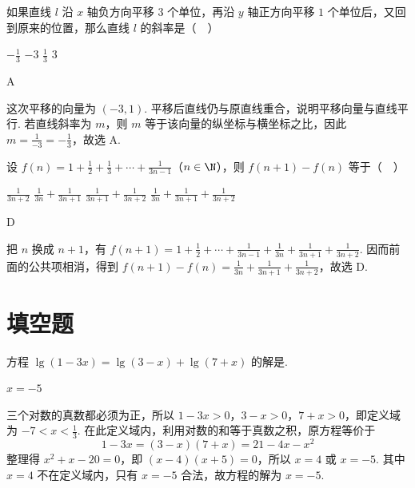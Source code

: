 \begin{problem}
如果直线 \(l\) 沿 \(x\) 轴负方向平移 \(3\) 个单位，再沿 \(y\) 轴正方向平移 \(1\) 个单位后，又回到原来的位置，那么直线 \(l\) 的斜率是（\(\quad\)）

\choices
    {\(-\frac{1}{3}\)}
    {\(-3\)}
    {\(\frac{1}{3}\)}
    {\(3\)}
\end{problem}

\begin{answer}
A
\end{answer}

\begin{solution}
这次平移的向量为 \((-3,1)\). 平移后直线仍与原直线重合，说明平移向量与直线平行. 若直线斜率为 \(m\)，则 \(m\) 等于该向量的纵坐标与横坐标之比，因此 \(m=\frac{1}{-3}=-\frac13\)，故选 A.
\end{solution}

\begin{problem}
设 \(f(n) = 1 + \frac{1}{2} + \frac{1}{3} + \cdots + \frac{1}{3n-1}\)（\(n \in \N\)），则 \(f(n+1) - f(n)\) 等于（\(\quad\)）

\choices
    {\(\frac{1}{3n+2}\)}
    {\(\frac{1}{3n} + \frac{1}{3n + 1}\)}
    {\(\frac{1}{3n + 1} +\frac{1}{3n + 2}\)}
    {\(\frac{1}{3n} + \frac{1}{3n + 1} + \frac{1}{3n + 2}\)}
\end{problem}

\begin{answer}
D
\end{answer}

\begin{solution}
把 \(n\) 换成 \(n+1\)，有 \(f(n+1)=1+\frac12+\cdots+\frac1{3n-1}+\frac1{3n}+\frac1{3n+1}+\frac1{3n+2}\). 因而前面的公共项相消，得到 \(f(n+1)-f(n)=\frac1{3n}+\frac1{3n+1}+\frac1{3n+2}\)，故选 D.
\end{solution}

\section{填空题}

\begin{problem}
方程 \(\lg(1-3x)=\lg(3-x)+\lg(7+x)\) 的解是\fillinblank{}.
\end{problem}

\begin{answer}
\(x=-5\)
\end{answer}

\begin{solution}
三个对数的真数都必须为正，所以 \(1-3x>0\)，\(3-x>0\)，\(7+x>0\)，即定义域为 \(-7<x<\frac13\). 在此定义域内，利用对数的和等于真数之积，原方程等价于
\[
1-3x=(3-x)(7+x)=21-4x-x^2
\]
整理得 \(x^2+x-20=0\)，即 \((x-4)(x+5)=0\)，所以 \(x=4\) 或 \(x=-5\). 其中 \(x=4\) 不在定义域内，只有 \(x=-5\) 合法，故方程的解为 \(x=-5\).
\end{solution}

